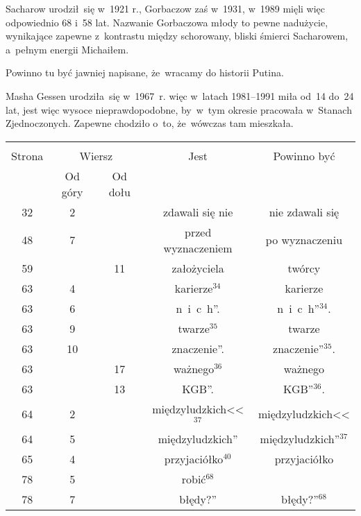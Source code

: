 \documentclass[a4paper,11pt]{article}
\begin{document}
\vspace{\spaceFour}


\start {} Sacharow urodził~się w~1921 r., Gorbaczow zaś w~1931,
w~1989 mięli więc odpowiednio 68 i~58 lat. Nazwanie Gorbaczowa młody
to pewne nadużycie, wynikające zapewne z~kontrastu między schorowany,
bliski śmierci Sacharowem, a~pełnym energii Michaiłem.

\vspace{\spaceFour}


\start {}  Powinno tu być jawniej napisane,
że~wracamy do historii Putina.

\vspace{\spaceFour}


\start {} Masha Gessen
urodziła~się w~1967~r. więc w~latach 1981--1991 miła od~14 do~24 lat,
jest więc wysoce nieprawdopodobne, by~w~tym okresie pracowała
w~Stanach Zjednoczonych. Zapewne chodziło o~to, że~wówczas tam
mieszkała.


\begin{center}

  \begin{tabular}{|c|c|c|c|c|}
    \hline
    & \multicolumn{2}{c|}{} & & \\
    Strona & \multicolumn{2}{c|}{Wiersz} & Jest
                              & Powinno być \\ \cline{2-3}
    & Od góry & Od dołu & & \\
    \hline
    32 &  2 & & zdawali się nie & nie zdawali się \\
    48 &  7 & & przed wyznaczeniem & po wyznaczeniu \\
    59 & & 11 & założyciela & twórcy \\
    63 &  4 & & karierze$^{ 34 }$ & karierze \\
    63 &  6 & & n~i~c~h”. & n~i~c~h”$^{ 34 }$. \\
    63 &  9 & & twarze$^{ 35 }$ & twarze \\
    63 & 10 & & znaczenie”. & znaczenie”$^{ 35 }$. \\
    63 & & 17 & ważnego$^{ 36 }$ & ważnego \\
    63 & & 13 & KGB”. & KGB”$^{ 36 }$. \\
    64 &  2 & & międzyludzkich<<$^{ 37 }$ & międzyludzkich<< \\
    64 &  5 & & międzyludzkich” & międzyludzkich”$^{ 37 }$ \\
    65 &  4 & & przyjaciółko$^{ 40 }$ & przyjaciółko \\
    78 &  5 & & robić$^{ 68 }$ & \\
    78 &  7 & & błędy?” & błędy?”$^{ 68 }$ \\
    \hline
  \end{tabular}

\end{center}
\end{document}
